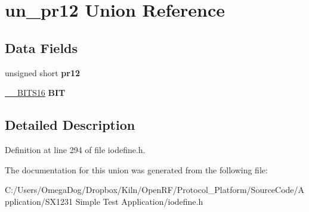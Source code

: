 \hypertarget{unionun__pr12}{\section{un\-\_\-pr12 Union Reference}
\label{unionun__pr12}
}
\subsection*{Data Fields}
\begin{DoxyCompactItemize}
\item 
\hypertarget{unionun__pr12_a1e62bdce9dda223565bbae23c4c0879a}{unsigned short {\bfseries pr12}}\label{unionun__pr12_a1e62bdce9dda223565bbae23c4c0879a}

\item 
\hypertarget{unionun__pr12_a4239711c122913b51a9c482a905c8d30}{\hyperlink{struct_____b_i_t_s16}{\-\_\-\-\_\-\-B\-I\-T\-S16} {\bfseries B\-I\-T}}\label{unionun__pr12_a4239711c122913b51a9c482a905c8d30}

\end{DoxyCompactItemize}


\subsection{Detailed Description}


Definition at line 294 of file iodefine.\-h.



The documentation for this union was generated from the following file\-:\begin{DoxyCompactItemize}
\item 
C\-:/\-Users/\-Omega\-Dog/\-Dropbox/\-Kiln/\-Open\-R\-F/\-Protocol\-\_\-\-Platform/\-Source\-Code/\-Application/\-S\-X1231 Simple Test Application/iodefine.\-h\end{DoxyCompactItemize}
